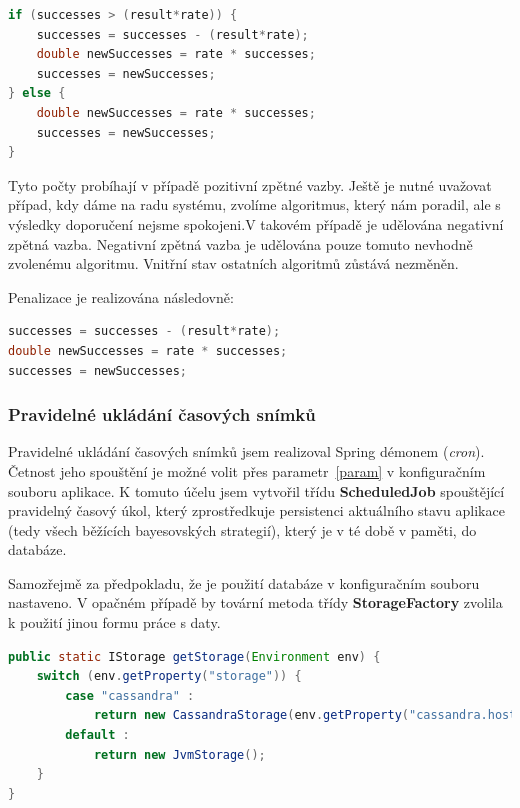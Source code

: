 \documentclass[thesis=M,czech]{FITthesis}[2014/05/07]
\begin{document}
\begin{lstlisting}[language=java]
if (successes > (result*rate)) {
    successes = successes - (result*rate);
    double newSuccesses = rate * successes;
    successes = newSuccesses;
} else {
    double newSuccesses = rate * successes;
    successes = newSuccesses;            
}
\end{lstlisting}	

Tyto počty probíhají v případě pozitivní zpětné vazby. Ještě je nutné uvažovat případ, kdy dáme na radu systému, zvolíme algoritmus, který nám poradil, ale s výsledky doporučení nejsme spokojeni.V takovém případě je udělována negativní zpětná vazba. Negativní zpětná vazba je udělována pouze tomuto nevhodně zvolenému algoritmu. Vnitřní stav ostatních algoritmů zůstává nezměněn.

Penalizace je realizována následovně:

\begin{lstlisting}[language=java]
successes = successes - (result*rate);
double newSuccesses = rate * successes;
successes = newSuccesses;
\end{lstlisting}	
  
\subsubsection{Pravidelné ukládání časových snímků}
\label{task}
Pravidelné ukládání časových snímků jsem realizoval Spring démonem (\emph{cron}). Četnost jeho spouštění je možné volit přes parametr~\ref{param} v konfiguračním souboru aplikace. K tomuto účelu jsem vytvořil třídu \textbf{ScheduledJob} spouštějící pravidelný časový úkol, který zprostředkuje persistenci aktuálního stavu aplikace (tedy všech běžících bayesovských strategií), který je v té době v paměti, do databáze.

Samozřejmě za předpokladu, že je použití databáze v konfiguračním souboru nastaveno. V opačném případě by tovární metoda třídy \textbf{StorageFactory} zvolila k použití jinou formu práce s daty.

\begin{lstlisting}[language=java]
public static IStorage getStorage(Environment env) {
    switch (env.getProperty("storage")) {
        case "cassandra" : 
            return new CassandraStorage(env.getProperty("cassandra.host"), env.getProperty("cassandra.keyspace"));                
        default : 
            return new JvmStorage();
    }
}
\end{lstlisting}
\end{document}
